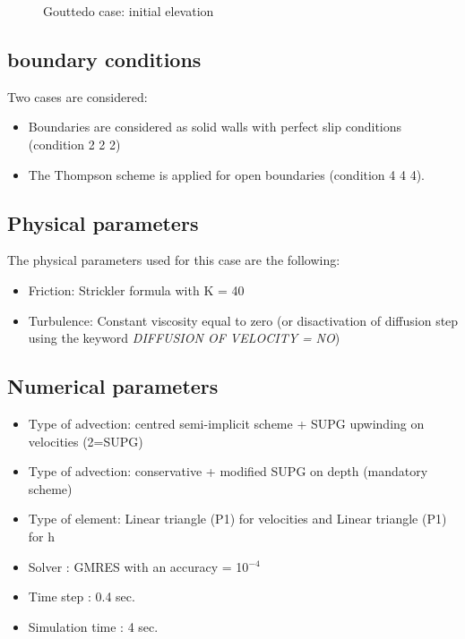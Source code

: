 \begin{figure}[H]
\begin{center}
\end{center}
\caption{Gouttedo case: initial elevation}
\label{fig:gouttedo_init}
\end{figure}

\subsection{boundary conditions}

Two cases are considered:
\begin{itemize}
\item Boundaries are considered as solid walls with perfect slip conditions (condition 2 2 2) 
\item The Thompson scheme is applied for open boundaries (condition 4 4 4).
\end{itemize}

\subsection{Physical parameters}
%
The physical parameters used for this case are the following:
\begin{itemize}
\item Friction: Strickler formula with K = 40
\item Turbulence: Constant viscosity equal to zero (or disactivation of
  diffusion step using the keyword  \textit{DIFFUSION OF VELOCITY =}\textit{
  NO})
\end{itemize}

\subsection{Numerical parameters}
\begin{itemize}
\item Type of advection: centred semi-implicit scheme + SUPG upwinding on
  velocities (2=SUPG)
\item Type of advection:  conservative + modified SUPG on depth (mandatory
  scheme)
\item  Type of element: Linear triangle (P1) for velocities and  Linear
  triangle (P1) for h
\item Solver : GMRES with an accuracy =  10${}^{-4}$
\item Time step : 0.4 sec.
\item Simulation time : 4 sec.
\end{itemize}

